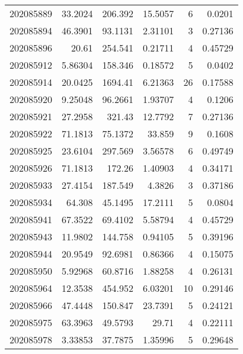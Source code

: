 \begin{tabular}{rrrrrr}
 202085889 &         33.2024  &      206.392  &           15.5057  &           6 & 0.0201  \\
 202085894 &         46.3901  &       93.1131 &            2.31101 &           3 & 0.27136 \\
 202085896 &         20.61    &      254.541  &            0.21711 &           4 & 0.45729 \\
 202085912 &          5.86304 &      158.346  &            0.18572 &           5 & 0.0402  \\
 202085914 &         20.0425  &     1694.41   &            6.21363 &          26 & 0.17588 \\
 202085920 &          9.25048 &       96.2661 &            1.93707 &           4 & 0.1206  \\
 202085921 &         27.2958  &      321.43   &           12.7792  &           7 & 0.27136 \\
 202085922 &         71.1813  &       75.1372 &           33.859   &           9 & 0.1608  \\
 202085925 &         23.6104  &      297.569  &            3.56578 &           6 & 0.49749 \\
 202085926 &         71.1813  &      172.26   &            1.40903 &           4 & 0.34171 \\
 202085933 &         27.4154  &      187.549  &            4.3826  &           3 & 0.37186 \\
 202085934 &         64.308   &       45.1495 &           17.2111  &           5 & 0.0804  \\
 202085941 &         67.3522  &       69.4102 &            5.58794 &           4 & 0.45729 \\
 202085943 &         11.9802  &      144.758  &            0.94105 &           5 & 0.39196 \\
 202085944 &         20.9549  &       92.6981 &            0.86366 &           4 & 0.15075 \\
 202085950 &          5.92968 &       60.8716 &            1.88258 &           4 & 0.26131 \\
 202085964 &         12.3538  &      454.952  &            6.03201 &          10 & 0.29146 \\
 202085966 &         47.4448  &      150.847  &           23.7391  &           5 & 0.24121 \\
 202085975 &         63.3963  &       49.5793 &           29.71    &           4 & 0.22111 \\
 202085978 &          3.33853 &       37.7875 &            1.35996 &           5 & 0.29648 \\

\end{tabular}
